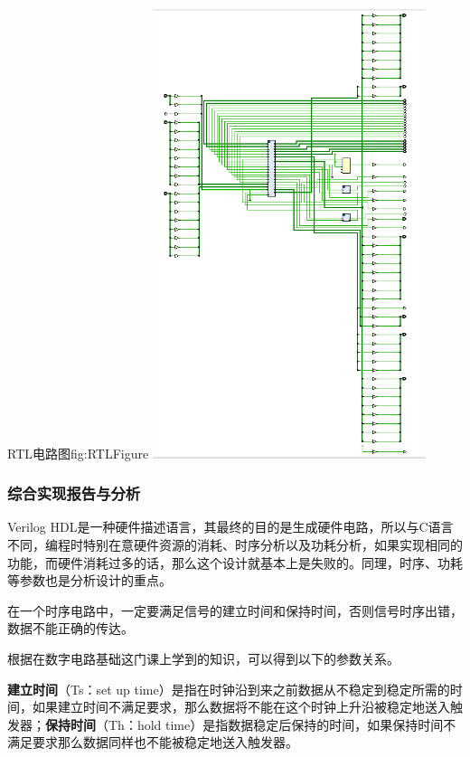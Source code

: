\documentclass[supercite]{HustGraduPaper}
\begin{document}
	\begin{generalfig}[htb]{RTL电路图}{fig:RTLFigure}
		\includegraphics[width=8cm]{Figures/RTLFigure.png}
	\end{generalfig}
	
	\subsubsection{综合实现报告与分析}
	
	Verilog HDL是一种硬件描述语言，其最终的目的是生成硬件电路，所以与C语言不同，编程时特别在意硬件资源的消耗、时序分析以及功耗分析，如果实现相同的功能，而硬件消耗过多的话，那么这个设计就基本上是失败的。同理，时序、功耗等参数也是分析设计的重点。
	
	
	在一个时序电路中，一定要满足信号的建立时间和保持时间，否则信号时序出错，数据不能正确的传达。
	
	根据在数字电路基础这门课上学到的知识，可以得到以下的参数关系。
	
	{\songti \bfseries 建立时间}（Ts：set up time）是指在时钟沿到来之前数据从不稳定到稳定所需的时间，如果建立时间不满足要求，那么数据将不能在这个时钟上升沿被稳定地送入触发器；{\songti \bfseries 保持时间}（Th：hold time）是指数据稳定后保持的时间，如果保持时间不满足要求那么数据同样也不能被稳定地送入触发器。
	
\end{document}

